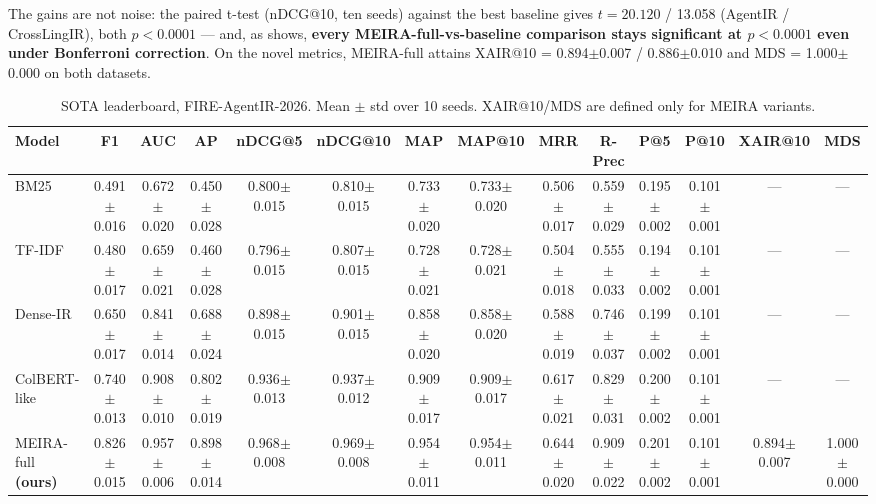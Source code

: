 The gains are not noise: the paired t-test (nDCG@10, ten seeds) against the best baseline gives $t = 20.120$ / 13.058 (AgentIR / CrossLingIR), both $p < 0.0001$ --- and, as  shows, \textbf{every MEIRA-full-vs-baseline comparison stays significant at $p < 0.0001$ even under Bonferroni correction}. On the novel metrics, MEIRA-full attains XAIR@10 = 0.894$\pm$0.007 / 0.886$\pm$0.010 and MDS = 1.000$\pm$0.000 on both datasets.

\begin{table}[tb]
\setlength{\tabcolsep}{2pt}
\scriptsize
\caption{SOTA leaderboard, FIRE-AgentIR-2026. Mean $\pm$ std over 10 seeds. XAIR@10/MDS are defined only for MEIRA variants.}
\label{tab:sota-agent}
\centering
\begin{tabular}{lccccccccccccc}
\toprule
Model & F1 & AUC & AP & nDCG@5 & nDCG@10 & MAP & MAP@10 & MRR & R-Prec & P@5 & P@10 & XAIR@10 & MDS \\
\midrule
BM25 & 0.491$\pm$0.016 & 0.672$\pm$0.020 & 0.450$\pm$0.028 & 0.800$\pm$0.015 & 0.810$\pm$0.015 & 0.733$\pm$0.020 & 0.733$\pm$0.020 & 0.506$\pm$0.017 & 0.559$\pm$0.029 & 0.195$\pm$0.002 & 0.101$\pm$0.001 & --- & --- \\
TF-IDF & 0.480$\pm$0.017 & 0.659$\pm$0.021 & 0.460$\pm$0.028 & 0.796$\pm$0.015 & 0.807$\pm$0.015 & 0.728$\pm$0.021 & 0.728$\pm$0.021 & 0.504$\pm$0.018 & 0.555$\pm$0.033 & 0.194$\pm$0.002 & 0.101$\pm$0.001 & --- & --- \\
Dense-IR & 0.650$\pm$0.017 & 0.841$\pm$0.014 & 0.688$\pm$0.024 & 0.898$\pm$0.015 & 0.901$\pm$0.015 & 0.858$\pm$0.020 & 0.858$\pm$0.020 & 0.588$\pm$0.019 & 0.746$\pm$0.037 & 0.199$\pm$0.002 & 0.101$\pm$0.001 & --- & --- \\
ColBERT-like & 0.740$\pm$0.013 & 0.908$\pm$0.010 & 0.802$\pm$0.019 & 0.936$\pm$0.013 & 0.937$\pm$0.012 & 0.909$\pm$0.017 & 0.909$\pm$0.017 & 0.617$\pm$0.021 & 0.829$\pm$0.031 & 0.200$\pm$0.002 & 0.101$\pm$0.001 & --- & --- \\
MEIRA-full \textbf{(ours)} & 0.826$\pm$0.015 & 0.957$\pm$0.006 & 0.898$\pm$0.014 & 0.968$\pm$0.008 & 0.969$\pm$0.008 & 0.954$\pm$0.011 & 0.954$\pm$0.011 & 0.644$\pm$0.020 & 0.909$\pm$0.022 & 0.201$\pm$0.002 & 0.101$\pm$0.001 & 0.894$\pm$0.007 & 1.000$\pm$0.000 \\
\bottomrule
\end{tabular}
\end{table}

